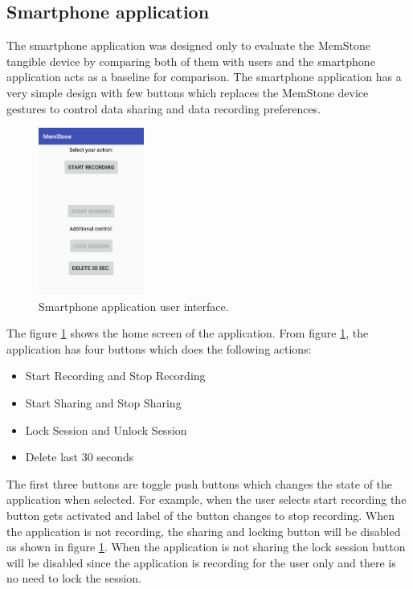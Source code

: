 \documentclass[mscthesis]{usiinfthesis}
\begin{document}
\subsection{Smartphone application}
\label{sec:smrt}
The smartphone application was designed only to evaluate the MemStone tangible device by comparing both of them with users and the smartphone application acts as a baseline for comparison. The smartphone application has a very simple design with few buttons which replaces the MemStone device gestures to control data sharing and data recording preferences. 
\begin{figure}[ht]
  \centering
  \includegraphics[width=0.31\textwidth]{Home_screen}
  \caption{Smartphone application user interface.}
  \label{figp1}
\end{figure}

The figure \ref{figp1} shows the home screen of the application. From figure \ref{figp1}, the application has four buttons which does the following actions: 
\begin{itemize}
\item Start Recording and Stop Recording
\item Start Sharing and Stop Sharing
\item Lock Session and Unlock Session
\item Delete last 30 seconds
\end{itemize}

The first three buttons are toggle push buttons which changes the state of the application when selected. For example, when the user selects start recording the button gets activated and label of the button changes to stop recording. When the application is not recording, the sharing and locking button will be disabled as shown in figure \ref{figp1}. When the application is not sharing the lock session button will be disabled since the application is recording for the user only and there is no need to lock the session. 
\end{document}
